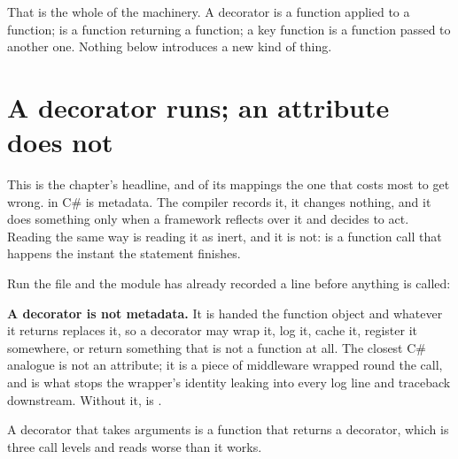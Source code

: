 \noindent
That is the whole of the machinery. A decorator is a function applied to a
function;  is a function returning a function; a
key function is a function passed to another one. Nothing below introduces
a new kind of thing.

\section{A decorator runs; an attribute does not}
\label{sec:ch05-decorators}

This is the chapter's headline, and of its mappings the one that costs
most to get wrong. \code{[Timed]} in C\# is metadata. The compiler
records it, it changes nothing, and it does something only when a
framework reflects over it and decides to act. Reading  the
same way is reading it as inert, and it is not:  is a
function call that happens the instant the  statement
finishes.


\noindent
Run the file and the module has already recorded a line before anything is
called:



\begin{trapbox}
\textbf{A decorator is not metadata.} It is handed the function object and
whatever it returns replaces it, so a decorator may wrap it, log it, cache
it, register it somewhere, or return something that is not a function at
all. The closest C\# analogue is not an attribute; it is a piece of
middleware wrapped round the call, and  is what stops
the wrapper's identity leaking into every log line and traceback
downstream. Without it,  is .
\end{trapbox}

\noindent
A decorator that takes arguments is a function that returns a decorator,
which is three call levels and reads worse than it works.


